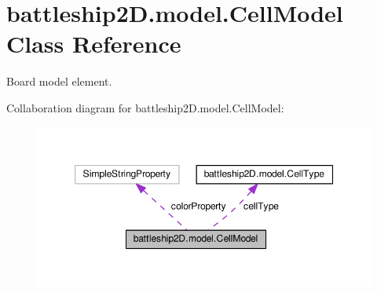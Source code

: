 \hypertarget{classbattleship2D_1_1model_1_1CellModel}{\section{battleship2\-D.\-model.\-Cell\-Model Class Reference}
\label{classbattleship2D_1_1model_1_1CellModel}
}


Board model element.  




Collaboration diagram for battleship2\-D.\-model.\-Cell\-Model\-:\nopagebreak
\begin{figure}[H]
\begin{center}
\leavevmode
\includegraphics[width=349pt]{classbattleship2D_1_1model_1_1CellModel__coll__graph}
\end{center}
\end{figure}
